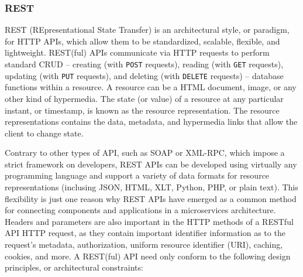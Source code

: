 \documentclass[8pt, table, xcdraw]{article}%
\begin{document}
\subsubsection{REST}

REST (REpresentational State Transfer) is an architectural style, or paradigm, for HTTP APIs, which allow them to be standardized, scalable, flexible, and lightweight. REST(ful) APIs communicate via HTTP requests to perform standard CRUD -- creating (with \lstinline{POST} requests), reading (with \lstinline{GET} requests), updating (with \lstinline{PUT} requests), and deleting (with \lstinline{DELETE} requests) -- database functions within a resource. A resource can be a HTML document, image, or any other kind of hypermedia. The state (or value) of a resource at any particular instant, or timestamp, is known as the resource representation. The resource representations contains the data, metadata, and hypermedia links that allow the client to change state.

Contrary to other types of API, such as SOAP or XML-RPC, which impose a strict framework on developers, REST APIs can be developed using virtually any programming language and support a variety of data formats for resource representations (inclusing JSON, HTML, XLT, Python, PHP, or plain text). This flexibility is just one reason why REST APIs have emerged as a common method for connecting components and applications in a microservices architecture. Headers and parameters are also important in the HTTP methods of a RESTful API HTTP request, as they contain important identifier information as to the request's metadata, authorization, uniform resource identifier (URI), caching, cookies, and more. A REST(ful) API need only conform to the following design principles, or architectural constraints: 
\end{document}
